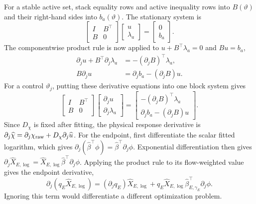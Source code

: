 For a stable active set, stack equality rows and active inequality rows into $B(\vartheta)$ and their right-hand sides into $b_a(\vartheta)$. The stationary system is
\begin{equation}
\begin{bmatrix}I&B^\top\\B&0\end{bmatrix}
\begin{bmatrix}u\\\lambda_a\end{bmatrix}
=\begin{bmatrix}0\\b_a\end{bmatrix}.
\label{eq:plant_active_system}
\end{equation}
The componentwise product rule is now applied to $u+B^\top\lambda_a=0$ and $Bu=b_a$,
\begin{align}
\partial_j u+B^\top\partial_j\lambda_a&=-(\partial_jB)^\top\lambda_a,\\
B\partial_j u&=\partial_jb_a-(\partial_jB)u.
\end{align}
For a control $\vartheta_j$, putting these derivative equations into one block system gives
\begin{equation}
\begin{bmatrix}I&B^\top\\B&0\end{bmatrix}
\begin{bmatrix}\partial_j u\\\partial_j\lambda_a\end{bmatrix}
=\begin{bmatrix}-(\partial_jB)^\top\lambda_a\\
\partial_jb_a-(\partial_jB)u\end{bmatrix}.
\label{eq:plant_active_sensitivity}
\end{equation}
Since $D_\chi$ is fixed after fitting, the physical response derivative is $\partial_j\widehat\chi=\partial_j\chi_{\rm raw}+D_\chi\partial_j\widehat u$. For the endpoint, first differentiate the scalar fitted logarithm, which gives $\partial_j(\widehat\beta^\top\phi)=\widehat\beta^\top\partial_j\phi$. Exponential differentiation then gives $\partial_j\widehat X_{E,\log}=\widehat X_{E,\log}\widehat\beta^\top\partial_j\phi$. Applying the product rule to its flow-weighted value gives the endpoint derivative,
\begin{equation}
\partial_j(q_E\widehat X_{E,\log})
=(\partial_jq_E)\widehat X_{E,\log}
+q_E\widehat X_{E,\log}\widehat\beta_{E,\gamma_E}^\top\partial_j\phi.
\end{equation}
Ignoring this term would differentiate a different optimization problem.

